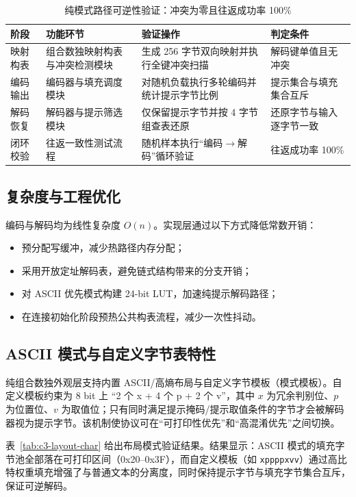 \begin{table}[H]
\centering
\small
\caption{纯模式路径可逆性验证：冲突为零且往返成功率 100\%}
\label{tab:c3-full-verify-map}
\begin{tabular}{p{2.8cm}p{4.0cm}p{3.9cm}p{2.2cm}}
\toprule
阶段 & 功能环节 & 验证操作 & 判定条件 \\
\midrule
映射构表 & 组合数独映射构表与冲突检测模块 &
生成 256 字节双向映射并执行全键冲突扫描 &
解码键单值且无冲突 \\
\midrule
编码输出 & 编码器与填充调度模块 &
对随机负载执行多轮编码并统计提示字节比例 &
提示集合与填充集合互斥 \\
\midrule
解码恢复 & 解码器与提示筛选模块 &
仅保留提示字节并按 4 字节组查表还原 &
还原字节与输入逐字节一致 \\
\midrule
闭环校验 & 往返一致性测试流程 &
随机样本执行“编码$\rightarrow$解码”循环验证 &
往返成功率 100\% \\
\bottomrule
\end{tabular}
\end{table}

\subsection{复杂度与工程优化}
编码与解码均为线性复杂度 $O(n)$。实现层通过以下方式降低常数开销：
\begin{itemize}
  \item 预分配写缓冲，减少热路径内存分配；
  \item 采用开放定址解码表，避免链式结构带来的分支开销；
  \item 对 ASCII 优先模式构建 24-bit LUT，加速纯提示解码路径；
  \item 在连接初始化阶段预热公共构表流程，减少一次性抖动。
\end{itemize}

\subsection{ASCII 模式与自定义字节表特性}
纯组合数独外观层支持内置 ASCII/高熵布局与自定义字节模板（模式模板）。自定义模板约束为 8 bit 上 ``2 个 x + 4 个 p + 2 个 v''，其中 $x$ 为冗余判别位、$p$ 为位置位、$v$ 为取值位；只有同时满足提示掩码/提示取值条件的字节才会被解码器视为提示字节。该机制使协议可在“可打印性优先”和“高混淆优先”之间切换。

表~\ref{tab:c3-layout-char} 给出布局模式验证结果。结果显示：ASCII 模式的填充字节池全部落在可打印区间（0x20--0x3F），而自定义模板（如 \texttt{xppppxvv}）通过高比特权重填充增强了与普通文本的分离度，同时保持提示字节与填充字节集合互斥，保证可逆解码。

